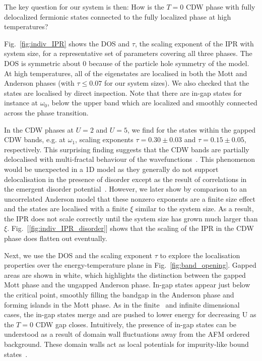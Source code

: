 The key question for our system is then: How is the \(T=0\) CDW phase with fully delocalized fermionic states connected to the fully localized phase at high temperatures? 


Fig.~\ref{fig:indiv_IPR} shows the \ac{DOS} and \(\tau\), the scaling exponent of the IPR with system size, for a representative set of parameters covering all three phases. The DOS is symmetric about \(0\) because of the particle hole symmetry of the model. At high temperatures, all of the eigenstates are localised in both the Mott and Anderson phases (with \(\tau \leq 0.07\) for our system sizes). We also checked that the states are localised by direct inspection. Note that there are in-gap states for instance at \(\omega_0\), below the upper band which are localized and smoothly connected across the phase transition. 

In the CDW phases at \(U=2\) and \(U=5\), we find for the states within the gapped CDW bands, e.g. at \(\omega_1\), scaling exponents \(\tau = 0.30\pm0.03\) and \(\tau = 0.15\pm0.05\), respectively. This surprising finding suggests that the CDW bands are partially delocalised with multi-fractal behaviour of the wavefunctions~\cite{eversAndersonTransitions2008a}. This phenomenon would be unexpected in a 1D model as they generally do not support delocalisation in the presence of disorder except as the result of correlations in the emergent disorder potential~\cite{croyAndersonLocalization1D2011,goldshteinPurePointSpectrum1977a}. However, we later show by comparison to an uncorrelated Anderson model that these nonzero exponents are a finite size effect and the states are localised with a finite \(\xi\) similar to the system size. As a result, the IPR does not scale correctly until the system size has grown much larger than \(\xi\). Fig.~[\ref{fig:indiv_IPR_disorder}] shows that the scaling of the IPR in the CDW phase does flatten out eventually. 

Next, we use the \ac{DOS} and the scaling exponent \(\tau\) to explore the localisation properties over the energy-temperature plane in Fig.~\ref{fig:band_opening}. Gapped areas are shown in white, which highlights the distinction between the gapped Mott phase and the ungapped Anderson phase. In-gap states appear just below the critical point, smoothly filling the bandgap in the Anderson phase and forming islands in the Mott phase. As in the finite~\cite{zondaGaplessRegimeCharge2019} and infinite dimensional~\cite{hassanSpectralPropertiesChargedensitywave2007} cases, the in-gap states merge and are pushed to lower energy for decreasing U as the \(T=0\) CDW gap closes. 
Intuitively, the presence of in-gap states can be understood as a result of domain wall fluctuations away from the AFM ordered background. These domain walls act as local potentials for impurity-like bound states~\cite{zondaGaplessRegimeCharge2019}. 


